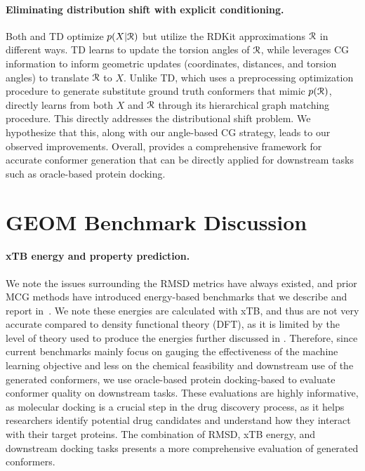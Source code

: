 \paragraph{Eliminating distribution shift with explicit conditioning.}
Both \model and TD optimize $p(X|{\mathcal{R}})$ but utilize the RDKit approximations ${\mathcal{R}}$ in different ways. TD learns to update the torsion angles of ${\mathcal{R}}$, while \model leverages CG information to inform geometric updates (coordinates, distances, and torsion angles) to translate ${\mathcal{R}}$ to $X$.
Unlike TD, which uses a preprocessing optimization procedure to generate substitute ground truth conformers that mimic $p({\mathcal{R}})$, 
\model directly learns from both $X$ and ${\mathcal{R}}$ through its hierarchical graph matching procedure. This directly addresses the distributional shift problem.
We hypothesize that this, along with our angle-based CG strategy, leads to our observed improvements.
Overall, \model provides a comprehensive framework for accurate conformer generation that can be directly applied for downstream tasks such as oracle-based protein docking. 

\section{GEOM Benchmark Discussion}
\label{section:geom-xtb}
\paragraph{xTB energy and property prediction.}
We note the issues surrounding the RMSD metrics have always existed, and prior MCG methods have introduced energy-based benchmarks that we describe and report in~. We note these energies are calculated with xTB, and thus are not very accurate compared to density functional theory (DFT), as it is limited by the level of theory used to produce the energies further discussed in \cite{GEOM}.
Therefore, since current benchmarks mainly focus on gauging the effectiveness of the machine learning objective and less on the chemical feasibility and downstream use of the generated conformers, we use oracle-based protein docking-based to evaluate conformer quality on downstream tasks.
These evaluations are highly informative, as molecular docking is a crucial step in the drug discovery process, as it helps researchers identify potential drug candidates and understand how they interact with their target proteins.
The combination of RMSD, xTB energy, and downstream docking tasks presents a more comprehensive evaluation of generated conformers.
